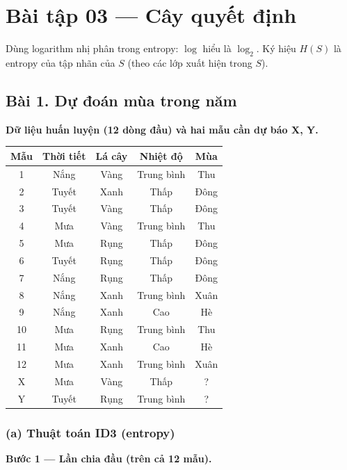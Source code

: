 \section*{Bài tập 03 --- Cây quyết định}

Dùng logarithm nhị phân trong entropy: \(\log\) hiểu là \(\log_2\).
Ký hiệu \(H(S)\) là entropy của tập nhãn của \(S\) (theo các lớp xuất hiện trong \(S\)).

\subsection*{Bài 1. Dự đoán mùa trong năm}

\textbf{Dữ liệu huấn luyện (12 dòng đầu) và hai mẫu cần dự báo X, Y.}

\begin{center}
{\small
\begin{tabular}{@{}ccccc@{}}\toprule
Mẫu & Thời tiết & Lá cây & Nhiệt độ & Mùa\\\midrule
1 & Nắng & Vàng & Trung bình & Thu\\
2 & Tuyết & Xanh & Thấp & Đông\\
3 & Tuyết & Vàng & Thấp & Đông\\
4 & Mưa & Vàng & Trung bình & Thu\\
5 & Mưa & Rụng & Thấp & Đông\\
6 & Tuyết & Rụng & Thấp & Đông\\
7 & Nắng & Rụng & Thấp & Đông\\
8 & Nắng & Xanh & Trung bình & Xuân\\
9 & Nắng & Xanh & Cao & Hè\\
10 & Mưa & Rụng & Trung bình & Thu\\
11 & Mưa & Xanh & Cao & Hè\\
12 & Mưa & Xanh & Trung bình & Xuân\\
X & Mưa & Vàng & Thấp & ?\\
Y & Tuyết & Rụng & Trung bình & ?\\
\bottomrule
\end{tabular}
}
\end{center}

\subsubsection*{(a) Thuật toán ID3 (entropy)}

\textbf{Bước 1 --- Lần chia đầu (trên cả 12 mẫu).}

